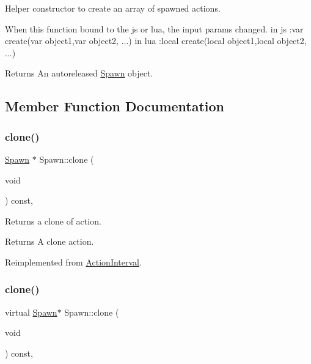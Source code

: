 Helper constructor to create an array of spawned actions. 
\begin{DoxyCode}
When \textcolor{keyword}{this} \textcolor{keyword}{function} bound to the js or lua, the input params changed.
in js  :var   create(var   object1,var   object2, ...)
in lua :local create(local object1,local object2, ...)
\end{DoxyCode}


\begin{DoxyReturn}{Returns}
An autoreleased \hyperlink{classSpawn}{Spawn} object. 
\end{DoxyReturn}


\subsection{Member Function Documentation}
\mbox{\label{classSpawn_a1c7481d301d5144cf1609296274d0f9d}} 
\subsubsection{\texorpdfstring{clone()}{clone()}\hspace{0.1cm}{\footnotesize\ttfamily [1/2]}}
{\footnotesize\ttfamily \hyperlink{classSpawn}{Spawn} $\ast$ Spawn\+::clone (\begin{DoxyParamCaption}\item[{void}]{ }\end{DoxyParamCaption}) const\hspace{0.3cm}{\ttfamily [override]}, {\ttfamily [virtual]}}

Returns a clone of action.

\begin{DoxyReturn}{Returns}
A clone action. 
\end{DoxyReturn}


Reimplemented from \hyperlink{classActionInterval_abc93ce0c2f54a90eb216a7803f25f44a}{Action\+Interval}.

\mbox{\label{classSpawn_ad564aef525ff1be991b3a8edb989f163}} 
\subsubsection{\texorpdfstring{clone()}{clone()}\hspace{0.1cm}{\footnotesize\ttfamily [2/2]}}
{\footnotesize\ttfamily virtual \hyperlink{classSpawn}{Spawn}$\ast$ Spawn\+::clone (\begin{DoxyParamCaption}\item[{void}]{ }\end{DoxyParamCaption}) const\hspace{0.3cm}{\ttfamily [override]}, {\ttfamily [virtual]}}

